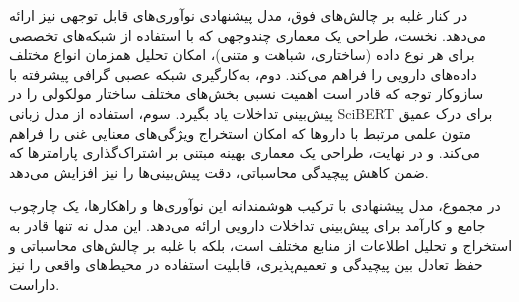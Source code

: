 در کنار غلبه بر چالش‌های فوق، مدل پیشنهادی نوآوری‌های قابل توجهی نیز ارائه می‌دهد. نخست، طراحی یک معماری چندوجهی که با استفاده از شبکه‌های تخصصی برای هر نوع داده (ساختاری، شباهت و متنی)، امکان تحلیل همزمان انواع مختلف داده‌های دارویی را فراهم می‌کند. دوم، به‌کارگیری شبکه عصبی گرافی پیشرفته با سازوکار توجه که قادر است اهمیت نسبی بخش‌های مختلف ساختار مولکولی را در پیش‌بینی تداخلات یاد بگیرد. سوم، استفاده از مدل زبانی SciBERT برای درک عمیق متون علمی مرتبط با داروها که امکان استخراج ویژگی‌های معنایی غنی را فراهم می‌کند. و در نهایت، طراحی یک معماری بهینه مبتنی بر اشتراک‌گذاری پارامترها که ضمن کاهش پیچیدگی محاسباتی، دقت پیش‌بینی‌ها را نیز افزایش می‌دهد.

در مجموع، مدل پیشنهادی با ترکیب هوشمندانه این نوآوری‌ها و راهکارها، یک چارچوب جامع و کارآمد برای پیش‌بینی تداخلات دارویی ارائه می‌دهد. این مدل نه تنها قادر به استخراج و تحلیل اطلاعات از منابع مختلف است، بلکه با غلبه بر چالش‌های محاسباتی و حفظ تعادل بین پیچیدگی و تعمیم‌پذیری، قابلیت استفاده در محیط‌های واقعی را نیز داراست.
